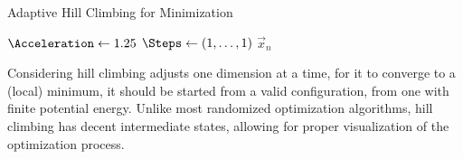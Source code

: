 \begin{algorithm}[H]
  \caption{Adaptive Hill Climbing for Minimization}
  \label{algo:adaptive-hill-climbing}
  \vspace{5pt}
  \vspace{10pt}
  ${\Acceleration \gets 1.25}$\;
  ${\Steps \gets (1, \ldots, 1)}$\;
  \;
  \;
  \Return ${\vec{x}_n}$
\end{algorithm}

\hfill

Considering hill climbing adjusts one dimension at a time, for it to converge to a (local) minimum, it should be started from a valid configuration, \ie{} from one with finite potential energy. Unlike most randomized optimization algorithms, hill climbing has decent intermediate states, allowing for proper visualization of the optimization process.
